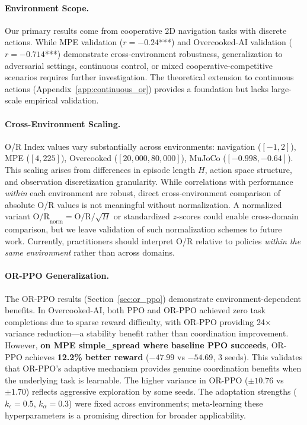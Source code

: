 \documentclass[twoside]{article}
\theoremstyle{remark}
\begin{document}
\paragraph{Environment Scope.}
Our primary results come from cooperative 2D navigation tasks with discrete actions. While MPE validation ($r = -0.24$***) and Overcooked-AI validation ($r = -0.714$***) demonstrate cross-environment robustness, generalization to adversarial settings, continuous control, or mixed cooperative-competitive scenarios requires further investigation. The theoretical extension to continuous actions (Appendix~\ref{app:continuous_or}) provides a foundation but lacks large-scale empirical validation.

\paragraph{Cross-Environment Scaling.}
O/R Index values vary substantially across environments: navigation ($[-1, 2]$), MPE ($[4, 225]$), Overcooked ($[20{,}000, 80{,}000]$), MuJoCo ($[-0.998, -0.64]$). This scaling arises from differences in episode length $H$, action space structure, and observation discretization granularity. While correlations with performance \textit{within} each environment are robust, direct cross-environment comparison of absolute O/R values is not meaningful without normalization. A normalized variant $\text{O/R}_{\text{norm}} = \text{O/R}/\sqrt{H}$ or standardized $z$-scores could enable cross-domain comparison, but we leave validation of such normalization schemes to future work. Currently, practitioners should interpret O/R relative to policies \textit{within the same environment} rather than across domains.

\paragraph{OR-PPO Generalization.}
The OR-PPO results (Section~\ref{sec:or_ppo}) demonstrate environment-dependent benefits. In Overcooked-AI, both PPO and OR-PPO achieved zero task completions due to sparse reward difficulty, with OR-PPO providing 24$\times$ variance reduction---a stability benefit rather than coordination improvement. However, \textbf{on MPE simple\_spread where baseline PPO succeeds}, OR-PPO achieves \textbf{12.2\% better reward} ($-47.99$ vs $-54.69$, 3 seeds). This validates that OR-PPO's adaptive mechanism provides genuine coordination benefits when the underlying task is learnable. The higher variance in OR-PPO ($\pm 10.76$ vs $\pm 1.70$) reflects aggressive exploration by some seeds. The adaptation strengths ($k_\epsilon = 0.5$, $k_\alpha = 0.3$) were fixed across environments; meta-learning these hyperparameters is a promising direction for broader applicability.
\end{document}
